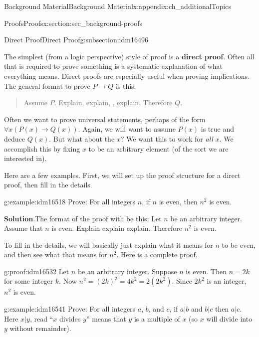 \documentclass[oneside,10pt,]{book}
\newcommand{\terminology}[1]{\textbf{#1}}
\numberwithin{equation}{chapter}
\def\imp{\rightarrow}
\begin{document}
\begin{appendixptx}{Background Material}{}{Background Material}{}{}{x:appendix:ch_additionalTopics}
\begin{sectionptx}{Proofs}{}{Proofs}{}{}{x:section:sec_background-proofs}
\begin{introduction}{}
\end{introduction}%
%
%
\typeout{************************************************}
\typeout{************************************************}
%
\begin{subsectionptx}{Direct Proof}{}{Direct Proof}{}{}{g:subsection:idm16496}
%
\par
The simplest (from a logic perspective) style of proof is a \terminology{direct proof}. Often all that is required to prove something is a systematic explanation of what everything means. Direct proofs are especially useful when proving implications. The general format to prove \(P \imp Q\) is this:%
\begin{quote}%
Assume \(P\). Explain, explain, \textellipsis{}, explain. Therefore \(Q\).%
\end{quote}
Often we want to prove universal statements, perhaps of the form \(\forall x (P(x) \imp Q(x))\). Again, we will want to assume \(P(x)\) is true and deduce \(Q(x)\). But what about the \(x\)? We want this to work for \emph{all} \(x\). We accomplish this by fixing \(x\) to be an arbitrary element (of the sort we are interested in).%
\par
Here are a few examples. First, we will set up the proof structure for a direct proof, then fill in the details.%
\begin{example}{}{g:example:idm16518}%
Prove: For all integers \(n\), if \(n\) is even, then \(n^2\) is even.%
\par\smallskip%
\noindent\textbf{Solution}.\hypertarget{g:solution:idm16524}{}\quad{}The format of the proof with be this: Let \(n\) be an arbitrary integer. Assume that \(n\) is even. Explain explain explain. Therefore \(n^2\) is even.%
\par
To fill in the details, we will basically just explain what it means for \(n\) to be even, and then see what that means for \(n^2\). Here is a complete proof.%
\begin{proofptx}{}{g:proof:idm16532}
Let \(n\) be an arbitrary integer. Suppose \(n\) is even. Then \(n = 2k\) for some integer \(k\). Now \(n^2 = (2k)^2 = 4k^2 = 2(2k^2)\). Since \(2k^2\) is an integer, \(n^2\) is even.%
\end{proofptx}
\end{example}
\begin{example}{}{g:example:idm16541}%
Prove: For all integers \(a\), \(b\), and \(c\), if \(a|b\) and \(b|c\) then \(a|c\). Here \(x|y\), read ``\(x\) divides \(y\)'' means that \(y\) is a multiple of \(x\) (so \(x\) will divide into \(y\) without remainder).%

\end{example}
\end{subsectionptx}
\end{sectionptx}
\end{appendixptx}
\end{document}
